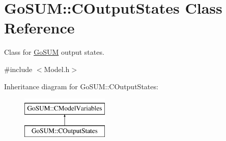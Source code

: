 \hypertarget{class_go_s_u_m_1_1_c_output_states}{\section{Go\-S\-U\-M\-:\-:C\-Output\-States Class Reference}
\label{class_go_s_u_m_1_1_c_output_states}
}


Class for \hyperlink{struct_go_s_u_m}{Go\-S\-U\-M} output states.  




{\ttfamily \#include $<$Model.\-h$>$}

Inheritance diagram for Go\-S\-U\-M\-:\-:C\-Output\-States\-:\begin{figure}[H]
\begin{center}
\leavevmode
\includegraphics[height=2.000000cm]{class_go_s_u_m_1_1_c_output_states}
\end{center}
\end{figure}
